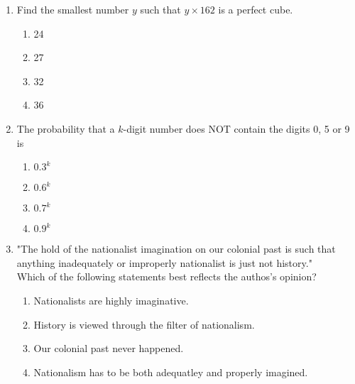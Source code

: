 \documentclass[journal,12pt,onecolumn]{IEEEtran}
\theoremstyle{remark}
\begin{document}
\begin{enumerate}
    \item Find the smallest number $y$ such that $y \times 162$ is a perfect cube.
        \hfill{}
        \begin{multicols}{4}
            \begin{enumerate}
                \item  24
                    \columnbreak
                \item 27
                    \columnbreak
                \item 32
                    \columnbreak
                \item 36
            \end{enumerate}
        \end{multicols}

    \item The probability that a $k$-digit number does NOT contain the digits 0, 5 or 9 is
        \hfill{}
        \begin{multicols}{4}
            \begin{enumerate}
                \item $0.3^k$
                    \columnbreak
                \item $0.6^k$
                    \columnbreak
                \item $0.7^k$
                    \columnbreak
                \item $0.9^k$
            \end{enumerate}
        \end{multicols}

    \item "The hold of the nationalist imagination on our colonial past is such that anything 
        inadequately or improperly nationalist is just not history."
        \\Which of the following statements best reflects the authos's opinion?
        \hfill{}
        \begin{enumerate}
            \item  Nationalists are highly imaginative.
            \item  History is viewed through the filter of nationalism.
            \item  Our colonial past never happened.
            \item  Nationalism has to be both adequatley and properly imagined.
        \end{enumerate}


\end{enumerate}
\end{document}
